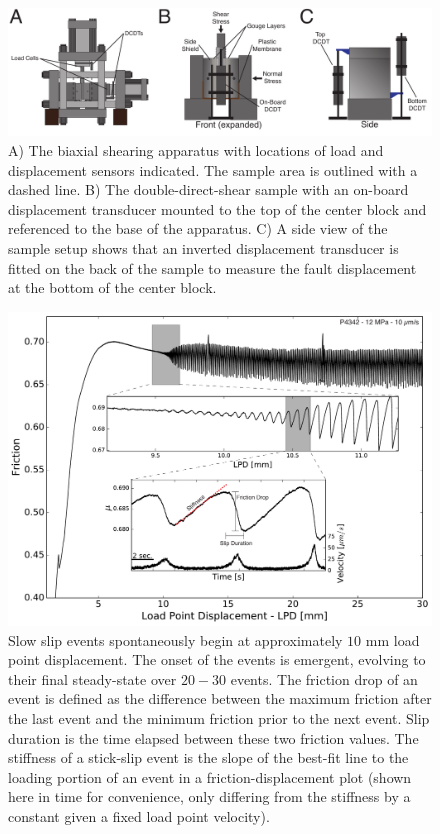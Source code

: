 \begin{figure}[H]
	\centering
		\includegraphics[scale=0.6]{chap_slow_slip_details/Figure_1.pdf}
   	\caption{A) The biaxial shearing apparatus with locations of load and displacement sensors indicated. The sample area is outlined with a dashed line. B) The double-direct-shear sample with an on-board displacement transducer mounted to the top of the center block and referenced to the base of the apparatus. C) A side view of the sample setup shows that an inverted displacement transducer is fitted on the back of the sample to measure the fault displacement at the bottom of the center block.}
  	\label{Figure_1}
\end{figure}

\clearpage

\begin{figure}[H]
	\centering
		\includegraphics[scale=0.5]{chap_slow_slip_details/Figure_2.pdf}
   	\caption{Slow slip events spontaneously begin at approximately $10$ mm load point displacement. The onset of the events is emergent, evolving to their final steady-state over $20-30$ events. The friction drop of an event is defined as the difference between the maximum friction after the last event and the minimum friction prior to the next event. Slip duration is the time elapsed between these two friction values. The stiffness of a stick-slip event is the slope of the best-fit line to the loading portion of an event in a friction-displacement plot (shown here in time for convenience, only differing from the stiffness by a constant given a fixed load point velocity).}
  	\label{Figure_2}
\end{figure}

